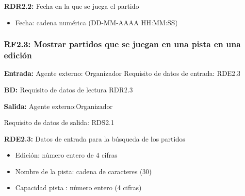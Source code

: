 \textbf{RDR2.2: }Fecha en la que se juega el partido
\begin{itemize}
	\item Fecha: cadena numérica (DD-MM-AAAA HH:MM:SS)
\end{itemize}
     
\subsubsection{RF2.3: Mostrar partidos que se juegan en una pista en una edición}
\textbf{Entrada:} Agente externo: Organizador        Requisito de datos de entrada: RDE2.3

\textbf{BD:} Requisito de datos de  lectura RDR2.3

\textbf{Salida:} Agente externo:Organizador

Requisito de datos de salida: RDS2.1

\textbf{RDE2.3:} Datos de entrada para la búsqueda de los partidos
\begin{itemize}
	\item Edición: número entero de 4 cifras
	\item Nombre de la pista: cadena de caracteres (30)
	\item Capacidad pista : número entero (4 cifras)
\end{itemize}

